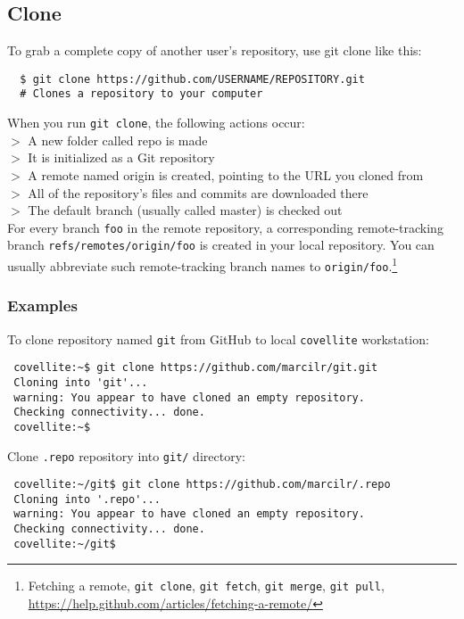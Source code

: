 \documentclass[12pt,letterpaper,dvips]{article}
\newcommand{\cmd}[1]{\texttt{#1}}
\begin{document}
\newpage
\subsection{Clone}
To grab a complete copy of another user's repository, use git clone like this:

\begin{Verbatim}
  $ git clone https://github.com/USERNAME/REPOSITORY.git
  # Clones a repository to your computer
\end{Verbatim}

\noindent When you run \cmd{git clone}, the following actions occur:\\
$>$ A new folder called repo is made\\
$>$ It is initialized as a Git repository\\
$>$ A remote named origin is created, pointing to the URL you cloned from\\
$>$ All of the repository's files and commits are downloaded there\\
$>$ The default branch (usually called master) is checked out\\

\noindent For every branch \cmd{foo} in the remote repository, a corresponding remote-tracking
branch \cmd{refs/remotes/origin/foo} is created in your local repository.  You can
usually abbreviate such remote-tracking branch names to \cmd{origin/foo}.\footnote{Fetching a remote,
\cmd{git clone}, \cmd{git fetch}, \cmd{git merge}, \cmd{git pull},
\href{https://help.github.com/articles/fetching-a-remote/}{https://help.github.com/articles/fetching-a-remote/}}


\subsubsection{Examples}
To clone repository named \cmd{git} from GitHub to local \cmd{covellite} workstation:
\begin{Verbatim}
 covellite:~$ git clone https://github.com/marcilr/git.git
 Cloning into 'git'...
 warning: You appear to have cloned an empty repository.
 Checking connectivity... done.
 covellite:~$
\end{Verbatim}

\newpage
\noindent Clone \cmd{.repo} repository into \cmd{git/} directory:
\begin{Verbatim}
 covellite:~/git$ git clone https://github.com/marcilr/.repo
 Cloning into '.repo'...
 warning: You appear to have cloned an empty repository.
 Checking connectivity... done.
 covellite:~/git$
\end{Verbatim}
\end{document}
